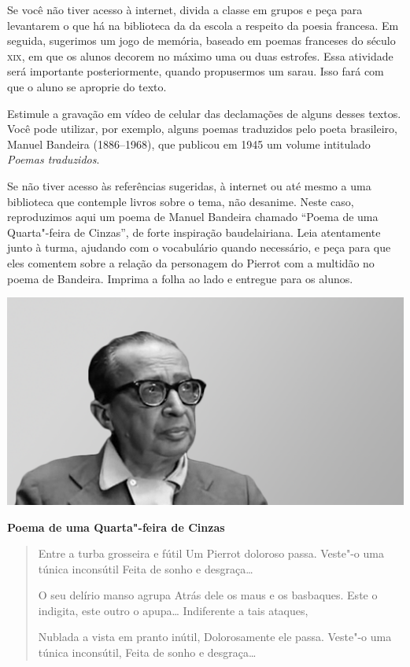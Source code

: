 \documentclass[12pt]{extarticle}
\begin{document}
Se você não tiver acesso à internet, divida a classe em grupos e 
peça para levantarem o que há na biblioteca da da escola a respeito da poesia 
francesa. Em seguida, sugerimos um jogo de memória, 
baseado em poemas franceses do século
\textsc{xix}, em que os alunos decorem no máximo uma ou duas estrofes. 
Essa atividade será importante posteriormente, 
quando propusermos um sarau. Isso fará com que o aluno se aproprie do texto.

Estimule a gravação em vídeo de celular das declamações
de alguns desses textos. Você pode utilizar, por exemplo, alguns poemas
traduzidos pelo poeta brasileiro, Manuel Bandeira (1886--1968), 
que publicou em 1945 um volume intitulado \textit{Poemas traduzidos}. 

Se não tiver acesso às referências sugeridas, à internet ou até mesmo a uma 
biblioteca que contemple livros sobre o tema, não desanime. 
Neste caso, reproduzimos aqui um poema de Manuel Bandeira chamado ``Poema de uma 
Quarta"-feira de Cinzas'', de forte inspiração baudelairiana. Leia atentamente 
junto à turma, ajudando com o vocabulário quando necessário, e peça para 
que eles comentem sobre a relação da personagem do Pierrot com a multidão
no poema de Bandeira. Imprima a folha ao lado e entregue para os alunos.

\pagebreak
\includegraphics[width=.8\textwidth]{./images/PNLD0010-22}

\vspace{5mm}

\textbf{Poema de uma Quarta"-feira de Cinzas}
\thispagestyle{empty}

\begin{verse}
Entre a turba grosseira e fútil
Um Pierrot doloroso passa.
Veste"-o uma túnica inconsútil
Feita de sonho e desgraça\ldots{}

O seu delírio manso agrupa
Atrás dele os maus e os basbaques.
Este o indigita, este outro o apupa\ldots{}
Indiferente a tais ataques,

Nublada a vista em pranto inútil,
Dolorosamente ele passa.
Veste"-o uma túnica inconsútil,
Feita de sonho e desgraça\ldots{} 
\end{verse}
\end{document}
